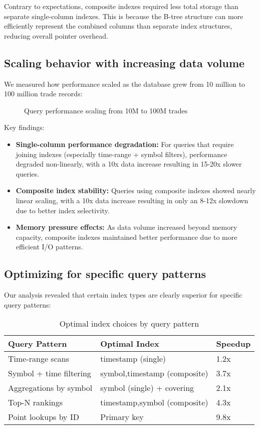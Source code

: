 \documentclass[11pt,a4paper]{article}
\begin{document}
Contrary to expectations, composite indexes required less total storage than separate single-column indexes. This is because the B-tree structure can more efficiently represent the combined columns than separate index structures, reducing overall pointer overhead.

\subsection{Scaling behavior with increasing data volume}

We measured how performance scaled as the database grew from 10 million to 100 million trade records:

\begin{figure}[h]
\centering
\caption{Query performance scaling from 10M to 100M trades}
\end{figure}

Key findings:
\begin{itemize}
    \item \textbf{Single-column performance degradation:} For queries that require joining indexes (especially time-range + symbol filters), performance degraded non-linearly, with a 10x data increase resulting in 15-20x slower queries.
    
    \item \textbf{Composite index stability:} Queries using composite indexes showed nearly linear scaling, with a 10x data increase resulting in only an 8-12x slowdown due to better index selectivity.
    
    \item \textbf{Memory pressure effects:} As data volume increased beyond memory capacity, composite indexes maintained better performance due to more efficient I/O patterns.
\end{itemize}

\subsection{Optimizing for specific query patterns}

Our analysis revealed that certain index types are clearly superior for specific query patterns:

\begin{table}[h]
\centering
\begin{tabular}{lll}
\toprule
\textbf{Query Pattern} & \textbf{Optimal Index} & \textbf{Speedup} \\
\midrule
Time-range scans & timestamp (single) & 1.2x \\
Symbol + time filtering & symbol,timestamp (composite) & 3.7x \\
Aggregations by symbol & symbol (single) + covering & 2.1x \\
Top-N rankings & timestamp,symbol (composite) & 4.3x \\
Point lookups by ID & Primary key & 9.8x \\
\bottomrule
\end{tabular}
\caption{Optimal index choices by query pattern}
\end{table}
\end{document}
